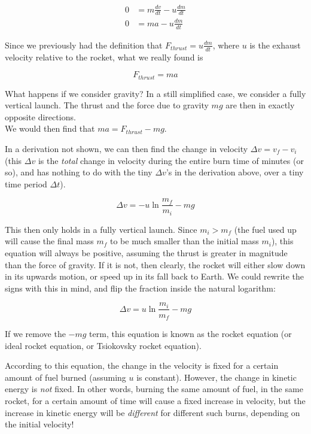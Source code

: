 \begin{align}
0 &= m \frac{dv}{dt} - u \frac{dm}{dt}\\
0 &= m a - u \frac{dm}{dt}
\end{align}

Since we previously had the definition that $\displaystyle F_{thrust} = u \frac{dm}{dt}$, where $u$ is the exhaust velocity relative to the rocket, what we really found is

\begin{equation}
F_{thrust} = m a
\end{equation}

What happens if we consider gravity? In a still simplified case, we consider a fully vertical launch. The thrust and the force due to gravity $m g$ are then in exactly opposite directions.\\
We would then find that $m a = F_{thrust} - m g$.

In a derivation not shown, we can then find the change in velocity $\Delta v = v_f - v_i$ (this $\Delta v$ is the \emph{total} change in velocity during the entire burn time of minutes (or so), and has nothing to do with the tiny $\Delta v$'s in the derivation above, over a tiny time period $\Delta t$).

\begin{equation}
\Delta v = -u \ln \frac{m_f}{m_i} - m g
\end{equation}

This then only holds in a fully vertical launch. Since $m_i > m_f$ (the fuel used up will cause the final mass $m_f$ to be much smaller than the initial mass $m_i$), this equation will always be positive, assuming the thrust is greater in magnitude than the force of gravity. If it is not, then clearly, the rocket will either slow down in its upwards motion, or speed up in its fall back to Earth. We could rewrite the signs with this in mind, and flip the fraction inside the natural logarithm:

\begin{equation}
\Delta v = u \ln \frac{m_i}{m_f} - m g
\end{equation}

If we remove the $- m g$ term, this equation is known as the rocket equation (or ideal rocket equation, or Tsiokovsky rocket equation).

According to this equation, the change in the velocity is fixed for a certain amount of fuel burned (assuming $u$ is constant). However, the change in kinetic energy is \emph{not} fixed. In other words, burning the same amount of fuel, in the same rocket, for a certain amount of time will cause a fixed increase in velocity, but the increase in kinetic energy will be \emph{different} for different such burns, depending on the initial velocity!

